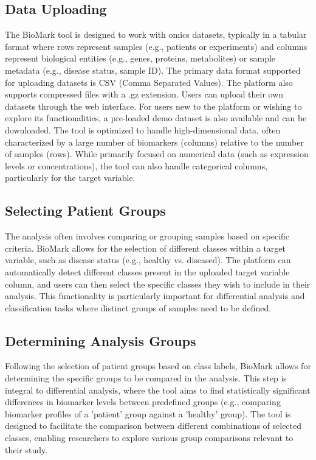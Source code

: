 \documentclass[journal]{IEEEtran}
\begin{document}
\subsection{Data Uploading}
The BioMark tool is designed to work with omics datasets, typically in a tabular format where rows represent samples (e.g., patients or experiments) and columns represent biological entities (e.g., genes, proteins, metabolites) or sample metadata (e.g., disease status, sample ID). The primary data format supported for uploading datasets is CSV (Comma Separated Values). The platform also supports compressed files with a .gz extension. Users can upload their own datasets through the web interface. For users new to the platform or wishing to explore its functionalities, a pre-loaded demo dataset is also available and can be downloaded. The tool is optimized to handle high-dimensional data, often characterized by a large number of biomarkers (columns) relative to the number of samples (rows). While primarily focused on numerical data (such as expression levels or concentrations), the tool can also handle categorical columns, particularly for the target variable.

\subsection{Selecting Patient Groups}
The analysis often involves comparing or grouping samples based on specific criteria. BioMark allows for the selection of different classes within a target variable, such as disease status (e.g., healthy vs. diseased). The platform can automatically detect different classes present in the uploaded target variable column, and users can then select the specific classes they wish to include in their analysis. This functionality is particularly important for differential analysis and classification tasks where distinct groups of samples need to be defined.

\subsection{Determining Analysis Groups}
Following the selection of patient groups based on class labels, BioMark allows for determining the specific groups to be compared in the analysis. This step is integral to differential analysis, where the tool aims to find statistically significant differences in biomarker levels between predefined groups (e.g., comparing biomarker profiles of a 'patient' group against a 'healthy' group). The tool is designed to facilitate the comparison between different combinations of selected classes, enabling researchers to explore various group comparisons relevant to their study.
\end{document}

